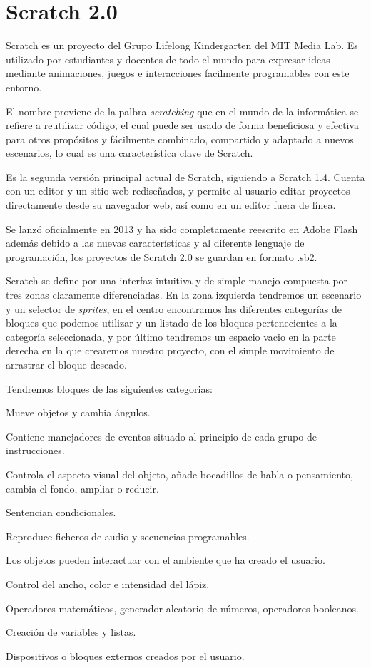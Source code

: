 \section{Scratch 2.0}
\label{sec:scratch}

Scratch es un proyecto del Grupo Lifelong Kindergarten del MIT Media Lab.
Es utilizado por estudiantes y docentes de todo el mundo para expresar ideas mediante animaciones, juegos e interacciones facilmente programables con este entorno.

El nombre proviene de la palbra \textit{scratching} que en el mundo de la informática se refiere a reutilizar código, el cual puede ser usado de forma beneficiosa y efectiva para otros propósitos y fácilmente combinado, compartido y adaptado a nuevos escenarios, lo cual es una característica clave de Scratch.

Es la segunda versión principal actual de Scratch, siguiendo a Scratch 1.4. Cuenta con un editor y un sitio web rediseñados, y permite al usuario editar proyectos directamente desde su navegador web, así como en un editor fuera de línea.

Se lanzó oficialmente en 2013 y ha sido completamente reescrito en Adobe Flash además debido a las nuevas características y al diferente lenguaje de programación, los proyectos de Scratch 2.0 se guardan en formato .sb2.

Scratch se define por una interfaz intuitiva y de simple manejo compuesta por tres zonas claramente diferenciadas. En la zona izquierda tendremos un escenario y un selector de \textit{sprites}, en el centro encontramos las diferentes categorías de bloques que podemos utilizar y un listado de los bloques pertenecientes a la categoría seleccionada, y por último tendremos un espacio vacio en la parte derecha en la que crearemos nuestro proyecto, con el simple movimiento de arrastrar el bloque deseado.

Tendremos bloques de las siguientes categorias:
\begin{description}[align=left]
\item [Movimiento] Mueve objetos y cambia ángulos.	  	 	
\item [Eventos] Contiene manejadores de eventos situado al principio de cada grupo de instrucciones.
\item [Apariencia] Controla el aspecto visual del objeto, añade bocadillos de habla o 
pensamiento, cambia el fondo, ampliar o reducir.	 	
\item [Control] Sentencian condicionales.
\item [Sonido] Reproduce ficheros de audio y secuencias programables.	 	
\item [Sensores] Los objetos pueden interactuar con el ambiente que ha creado el usuario.
\item [Lápiz] Control del ancho, color e intensidad del lápiz.	 	
\item [Operadores] Operadores matemáticos, generador aleatorio de números, operadores booleanos.
\item [Datos] Creación de variables y listas.	 	
\item [Mas Bloques] Dispositivos o bloques externos creados por el usuario.
\end{description}

